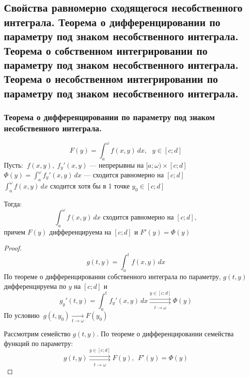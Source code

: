 \subsection{Свойства равномерно сходящегося несобственного интеграла. 
Теорема о дифференцировании по параметру под знаком несобственного интеграла. 
Теорема о собственном интегрировании по параметру под знаком несобственного интеграла. 
Теорема о несобственном интегрировании по параметру под знаком несобственного интеграла.}

\subsubsection{ Теорема о дифференцировании по параметру под знаком несобственного интеграла.}
\[ F(y) = \int_a^{\omega} f(x, y)\,dx, \ \ \ y \in [c; d] \]
Пусть: $\ f(x, y), \; f_y'(x, y)$ --- непрерывны на $[a; \omega) \times [c; d]$ \\
\phantom{Пусть} $\Phi(y) = \int_a^{\omega} f_y'(x, y)\,dx$ --- сходится равномерно на $[c; d]$ \\
\phantom{Пусть} $\int_a^{\omega} f(x, y)\,dx$ сходится хотя бы в 1 точке $y_0 \in [c; d]$

Тогда:
\[ \int_a^{\omega} f(x, y)\,dx \text{ сходится равномерно на } [c; d], \]
причем $F(y)$ дифференцируема на $[c; d]$ и $F'(y) = \Phi(y)$
\begin{proof}
    \[ g(t, y) = \int_a^t f(x, y)\,dx \]
    По теореме о дифференцировании собственного интеграла по параметру, $g(t, y)$ дифференцируема по $y$ на $[c; d]$ и 
    \[ g_y'(t, y) = \int_a^t f_y'(x, y)\,dx \overset{y \in [c; d]}{\underset{t \to \omega}{\rightrightarrows}} \Phi(y) \]
    По условию $\ g(t, y_0) \xrightarrow[t \to \omega]{} F(y_0)$
    
    Рассмотрим семейство $g(t, y)$. По теореме о дифференцировании семейства функций по параметру:
    \[ g(t, y) \overset{y \in [c; d]}{\underset{t \to \omega}{\rightrightarrows}} F(y), \ \ F'(y) = \Phi(y) \]
\end{proof}

